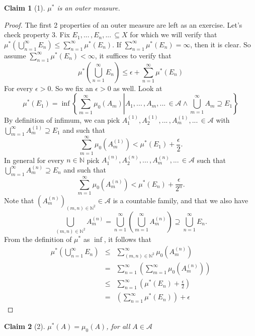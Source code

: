 \documentclass[letterpaper, 12pt]{article}
\newcommand{\bN}{\mathbb{N}}
\newcommand{\sA}{\mathcal{A}}
\theoremstyle{stdthm}
\theoremstyle{stddef}
\theoremstyle{stdnonum}
\newtheorem{claim}{Claim}
\theoremstyle{stdqands}
\theoremstyle{stdbold}
\begin{document}
\begin{claim}[1]
$\mu^*$ is an outer measure.
\end{claim}
\begin{proof}
The first 2 properties of an outer measure are left as an exercise. Let's check property 3. Fix $E_1,...\, , E_n , ...\, \subseteq X$ for which we will verify that $\mu^*\left(\bigcup_{n=1}^\infty E_n \right) \leq \sum_{n=1}^\infty \mu^*(E_n)$. If $\sum_{n=1}^\infty \mu^*(E_n) = \infty$, then it is clear. So assume $\sum_{n=1}^\infty \mu^*(E_n)<\infty$, it suffices to verify that 
\[\mu^*\left(\bigcup_{n=1}^\infty E_n \right) \leq \epsilon + \sum_{n=1}^\infty \mu^*(E_n) \]
For every $\epsilon >0$. So we fix an $\epsilon >0$ as well. Look at 
\[
\mu^*(E_1) = \inf \left.\left\lbrace \sum_{m=1}^\infty \mu_0(A_m)\right| A_1,...\, ,A_m,...\, \in \sA \wedge \bigcup_{m=1}^\infty A_m \supseteq E_1 \right \rbrace 
\]
By definition of infimum, we can pick $A_1^{(1)}, A_2^{(1)},...\,,A_m^{(1)}, ...\, \in \sA$ with $\bigcup_{m=1}^\infty A_m^{(1)} \supseteq E_1$ and such that 
\[
\sum_{m=1}^\infty \mu_0 (A_m^{(1)}) < \mu^*(E_1) + \frac{\epsilon}{2}.
\]
In general for every $n \in \bN$ pick $A_1^{(n)},A_2^{(n)},...\,,A_m^{(n)},...\, \in \sA$ such that $\bigcup_{m=1}^\infty A_m^{(n)} \supseteq E_n$ and such that 
\[\sum_{m=1}^\infty \mu_0 (A_m^{(n)}) < \mu^*(E_n) + \frac{\epsilon}{2^n}. \]
Note that $(A_m^{(n)})_{(m,n) \in \bN^2} \in \sA$ is a countable family, and that we also have
\[\bigcup_{(m,n)\in\bN^2} A_m^{(n)} = \bigcup_{n=1}^\infty \left( \bigcup_{m=1}^\infty A_m^{(n)} \right) \supseteq \bigcup_{n=1}^\infty E_n.\]
From the definition of $\mu^*$ as $\inf$, it follows that 
\begin{eqnarray*}
\mu^*\left( \bigcup_{n=1}^\infty E_n \right) &\leq& \sum_{(m,n)\in\bN^2}^\infty \mu_0(A_m^{(n)})\\ 
&=& \sum_{n=1}^\infty \left( \sum_{m=1}^\infty \mu_0 (A_m^{(n)})\right)\\ 
&\leq& \sum_{n=1}^\infty \left( \mu^*(E_n) + \frac{\epsilon}{2} \right)\\
 &=& \left( \sum_{n=1}^\infty \mu^*(E_n)\right) + \epsilon 
\end{eqnarray*}
\end{proof}

\begin{claim}[2]
$\mu^*(A) = \mu_0(A)$, for all $A \in \sA$
\end{claim}
\end{document}
